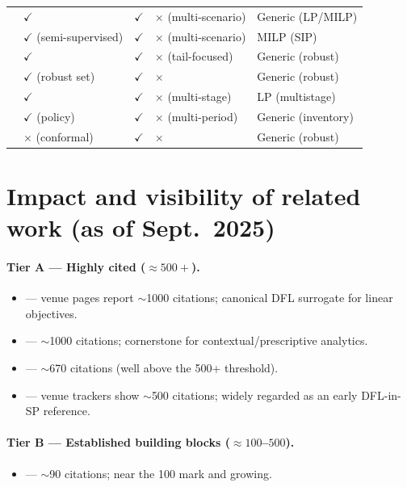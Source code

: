 \documentclass[11pt]{article}
\newcommand{\cmark}{\checkmark}
\newcommand{\xmark}{\times}
\begin{document}
\begin{longtable}{L{5.8cm}C{2.2cm}C{2.2cm}C{2.2cm}C{2.6cm}}
\citet{islip2025contextual} & $\cmark$ & $\cmark$ & $\xmark$ (multi-scenario) & Generic (LP/MILP) \\
\citet{wu2022cvae} & $\cmark$ (semi-supervised) & $\cmark$ & $\xmark$ (multi-scenario) & MILP (SIP) \\
\citet{cheng2025gendfl} & $\cmark$ & $\cmark$ & $\xmark$ (tail-focused) & Generic (robust) \\
\citet{chenreddy2022cro} & $\cmark$ (robust set) & $\cmark$ & $\xmark$ & Generic (robust) \\
\citet{bertsimas2023multistage} & $\cmark$ & $\cmark$ & $\xmark$ (multi-stage) & LP (multistage) \\
\citet{qi2023practical} & $\cmark$ (policy) & $\cmark$ & $\xmark$ (multi-period) & Generic (inventory) \\
\citet{patel2024cpo} & $\xmark$ (conformal) & $\cmark$ & $\xmark$ & Generic (robust) \\
\end{longtable}



\section*{Impact and visibility of related work (as of Sept.\ 2025)}
\paragraph{Tier A --- Highly cited ($\approx 500+$).}
\begin{itemize}
  \item \citet{elmachtoub2021spo} --- venue pages report $\sim$1000 citations; canonical DFL surrogate for linear objectives.
  \item \citet{bertsimas2020predictive} --- $\sim$1000 citations; cornerstone for contextual/prescriptive analytics.
  \item \citet{ban2019bigdata} --- $\sim$670 citations (well above the 500+ threshold).
  \item \citet{donti2017task} --- venue trackers show $\sim$500 citations; widely regarded as an early DFL-in-SP reference.
\end{itemize}

\paragraph{Tier B --- Established building blocks ($\approx 100$--$500$).}
\begin{itemize}
  \item \citet{kallus2023sof} --- $\sim$90 citations; near the 100 mark and growing.
\end{itemize}
\end{document}
